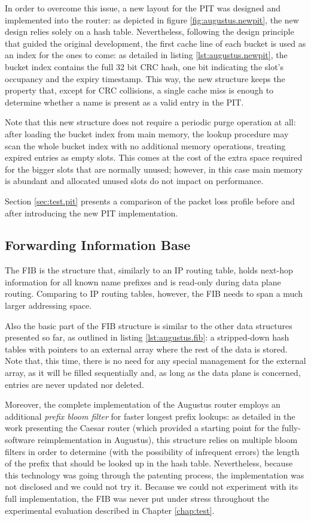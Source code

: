 \documentclass[11pt,a4paper,twoside,titlepage,openany]{book}
\begin{document}
In order to overcome this issue, a new layout for the PIT was designed and implemented into the router: as depicted in figure \ref{fig:augustus.newpit}, the new design relies solely on a hash table. Nevertheless, following the design principle that guided the original development, the first cache line of each bucket is used as an index for the ones to come: as detailed in listing \ref{lst:augustus.newpit}, the bucket index contains the full 32 bit CRC hash, one bit indicating the slot's occupancy and the expiry timestamp. This way, the new structure keeps the property that, except for CRC collisions, a single cache miss is enough to determine whether a name is present as a valid entry in the PIT.

Note that this new structure does not require a periodic purge operation at all: after loading the bucket index from main memory, the lookup procedure may scan the whole bucket index with no additional memory operations, treating expired entries as empty slots.
This comes at the cost of the extra space required for the bigger slots that are normally unused; however, in this case main memory is abundant and allocated unused slots do not impact on performance.

Section \ref{sec:test.pit} presents a comparison of the packet loss profile before and after introducing the new PIT implementation.

\subsection{Forwarding Information Base}\label{sec:augustus.fib}
The \gls{FIB} is the structure that, similarly to an IP routing table, holds next-hop information for all known name prefixes and is read-only during data plane routing. Comparing to IP routing tables, however, the \gls{FIB} needs to span a much larger addressing space.

Also the basic part of the FIB structure is similar to the other data structures presented so far, as outlined in listing \ref{lst:augustus.fib}: a stripped-down hash tables with pointers to an external array where the rest of the data is stored. Note that, this time, there is no need for any special management for the external array, as it will be filled sequentially and, as long as the data plane is concerned, entries are never updated nor deleted.

Moreover, the complete implementation of the Augustus router employs an additional \emph{prefix bloom filter} for faster longest prefix lookups: as detailed in the work presenting the Caesar router \cite{caesar} (which provided a starting point for the fully-software reimplementation in Augustus), this structure relies on multiple bloom filters in order to determine (with the possibility of infrequent errors) the length of the prefix that should be looked up in the hash table.
Nevertheless, because this technology was going through the patenting process, the implementation was not disclosed and we could not try it.
Because we could not experiment with its full implementation, the \gls{FIB} was never put under stress throughout the experimental evaluation described in Chapter \ref{chap:test}.
\end{document}

